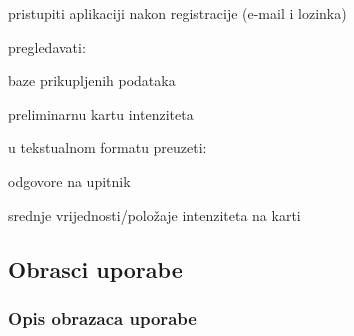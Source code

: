 \begin{packed_enum}
\begin{packed_enum}
				\end{packed_enum}

				\item  {}

				\begin{packed_enum}

					\item pristupiti aplikaciji nakon registracije (e-mail i lozinka)
					\item pregledavati:
					\begin{packed_enum}
						
						\item baze prikupljenih podataka
						\item preliminarnu kartu intenziteta

					\end{packed_enum}
					\item u tekstualnom formatu preuzeti:
					\begin{packed_enum}

						\item odgovore na upitnik
						\item srednje vrijednosti/položaje intenziteta na karti

					\end{packed_enum}
				\end{packed_enum}
			\end{packed_enum}
			
			\eject 
			
			
				
			\subsection{Obrasci uporabe}
				
				\subsubsection{Opis obrazaca uporabe}					

